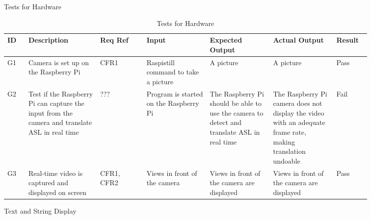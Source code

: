 \documentclass[12pt, titlepage]{article}
\begin{document}
\newpage
\centerline{Tests for Hardware}

\renewcommand{\arraystretch}{1.2}
\noindent \begin{longtable}{p{0.05\linewidth}|p{0.17\linewidth}|p{0.11\linewidth}|p{0.15\linewidth}|p{0.15\linewidth}|p{0.15\linewidth}|p{0.08\linewidth}}
\hline
\textbf{ID} & \textbf{Description} & \textbf{Req Ref} & \textbf{Input} & \textbf{Expected Output} & \textbf{Actual Output} & \textbf{Result}\\
\hline
G1 & Camera is set up on the Raspberry Pi & CFR1 & Raspistill command to take a picture & A picture & A picture & Pass\\ \hline
G2 & Test if the Raspberry Pi can capture the input from the camera and translate ASL in real time & ??? & Program is started on the Raspberry Pi & The Raspberry Pi should be able to use the camera to detect and translate ASL in real time & The Raspberry Pi camera does not display the video with an adequate frame rate, making translation undoable & Fail\\ \hline
G3 & Real-time video is captured and displayed on screen & CFR1, CFR2 & Views in front of the camera & Views in front of the camera are displayed & Views in front of the camera are displayed & Pass
\hline
\caption{Tests for Hardware}
\end{longtable}

\newpage
\centerline{Text and String Display}
\end{document}
